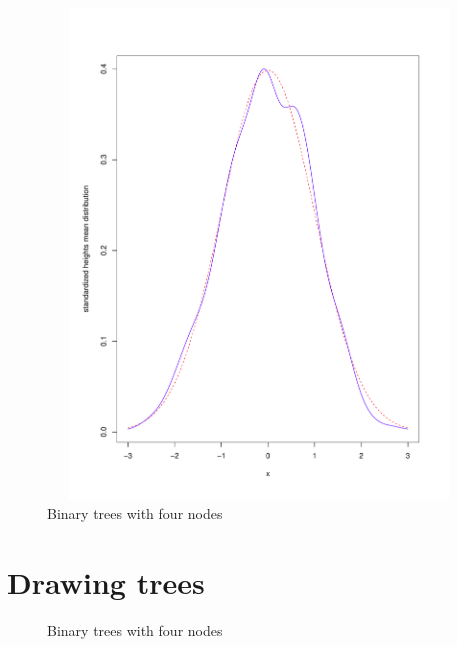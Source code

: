 \begin{figure}[htb]
  \centering
  \includegraphics[height=13cm,
  width=13cm]{pictures/repeated-sampling-height-mean.pdf}
  \caption{Binary trees with four nodes}
  \label{fig:binary-trees-with-four-nodes}
\end{figure}

\section{Drawing trees}

\begin{figure}[htb]
  \centering
  \caption{Binary trees with four nodes}
  \label{fig:binary-trees-with-four-nodes}
\end{figure}
